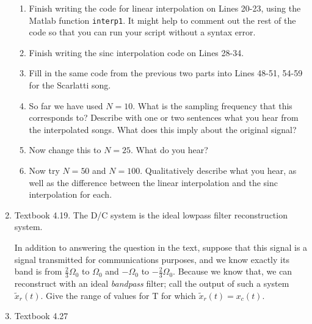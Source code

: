 \documentclass[draft]{siamltex}
\begin{document}
\begin{enumerate}
\vspace{2mm}
\begin{enumerate}
\item Finish writing the code for linear interpolation on Lines 20-23, using the Matlab function \texttt{interp1}. It might help to comment out the rest of the code so that you can run your script without a syntax error. 

\vspace{2mm}
\item Finish writing the sinc interpolation code on Lines 28-34. 

\vspace{2mm}
\item Fill in the same code from the previous two parts into Lines 48-51, 54-59 for the Scarlatti song.

\vspace{2mm}
\item So far we have used $N=10$. What is the sampling frequency that this corresponds to? Describe with one or two sentences what you hear from the interpolated songs. What does this imply about the original signal? 

\vspace{2mm}
\item Now change this to $N=25$. What do you hear?

\vspace{2mm}
\item Now try $N=50$ and $N=100$. Qualitatively describe what you hear, as well as the difference between the linear interpolation and the sinc interpolation for each.

\end{enumerate}

\vspace{5mm}
\item Textbook 4.19. The D/C system is the ideal lowpass filter reconstruction system. 

\vspace{2mm}In addition to answering the question in the text, suppose that this signal is a signal transmitted for communications purposes, and we know exactly its band is from $\frac{2}{3} \Omega_0$ to $\Omega_0$ and $-\Omega_0$ to $-\frac{2}{3} \Omega_0$. Because we know that, we can reconstruct with an ideal \emph{bandpass} filter; call the output of such a system $\widetilde{x}_r(t)$. Give the range of values for T for which $\widetilde{x}_r(t) = x_c(t)$.

\vspace{5mm}
\item Textbook 4.27


\end{enumerate}
\end{document}
